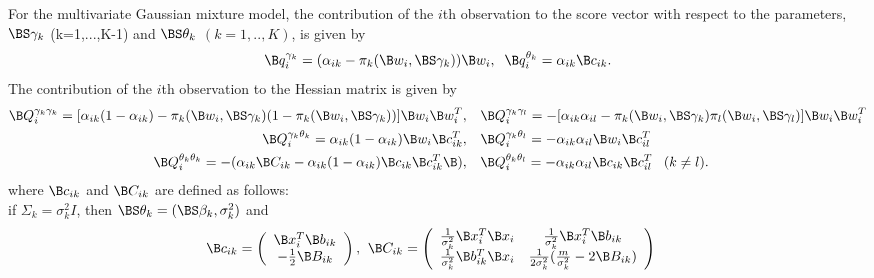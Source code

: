\begin{theorem}
For the multivariate Gaussian mixture model, the contribution of the $i$th observation to the score vector with respect to the parameters, $\BS\gamma_{k}$ (k=1,...,K-1) and $\BS\theta_{k}$ $(k=1,..,K)$, is given by
\begin{align*}
\B q_{i}^{\gamma_{k}}=(\alpha_{ik}-\pi_{k}(\B w_{i},\BS\gamma_{k}))\B w_{i},\;\; \B q_{i}^{\theta_{k}}=\alpha_{ik}\B c_{ik}.
\end{align*}
The contribution of the $i$th observation to the Hessian matrix is given by
\begin{align*}
\B Q_{i}^{\gamma_{k}\gamma_{k}}=[\alpha_{ik}(1-\alpha_{ik})-\pi_{k}(\B w_{i},\BS\gamma_{k})(1-\pi_{k}(\B w_{i},\BS\gamma_{k}))]\B w_{i}\B w_{i}^{T},& \quad \B Q_{i}^{\gamma_{k}\gamma_{l}}=-[\alpha_{ik}\alpha_{il}-\pi_{k}(\B w_{i},\BS\gamma_{k})\pi_{l}(\B w_{i},\BS\gamma_{l})]\B w_{i}\B w_{i}^{T}\\
\B Q_{i}^{\gamma_{k}\theta_{k}}=\alpha_{ik}(1-\alpha_{ik})\B w_{i}\B c_{ik}^{T},&\quad \B Q_{i}^{\gamma_{k}\theta_{l}}=-\alpha_{ik}\alpha_{il}\B w_{i}\B c_{il}^{T}\\
\B Q_{i}^{\theta_{k}\theta_{k}}=-(\alpha_{ik}\B C_{ik}-\alpha_{ik}(1-\alpha_{ik})\B c_{ik}\B c_{ik}^{T}\B ),&\quad \B Q_{i}^{\theta_{k}\theta_{l}}=-\alpha_{ik}\alpha_{il}\B c_{ik}\B c_{il}^{T}\;\;\;(k\not=l).
\end{align*}
where $\B c_{ik}$ and $\B C_{ik}$ are defined as follows:\\

if $\Sigma_{k}=\sigma_{k}^{2}I$, then $\BS\theta_{k}=(\BS\beta_{k},\sigma^{2}_{k})$ and
\begin{align*}
\B c_{ik}=\left( \begin{array}{c}\B x_{i}^{T}\B b_{ik}\\ -\frac{1}{2} \B B_{ik}\end{array}\right),&\;\;
\B C_{ik}=\left(\begin{array}{cc} \frac{1}{\sigma^{2}_{k}}\B x_{i}^{T}\B x_{i}&\frac{1}{\sigma^{2}_{k}}\B x_{i}^{T}\B b_{ik}\\ \frac{1}{\sigma^{2}_{k}}\B b^{T}_{ik}\B x_{i}&\frac{1}{2\sigma^{2}_{k}}(\frac{m}{\sigma^{2}_{k}}-2\B B_{ik})\end{array} \right)
\end{align*}


\end{theorem}
